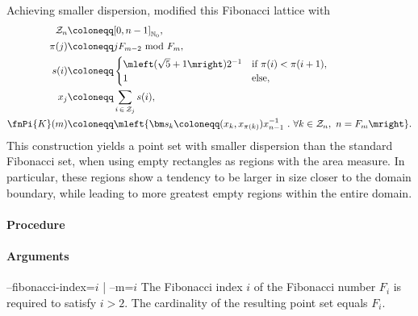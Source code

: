 
Achieving smaller dispersion,  modified this Fibonacci lattice with
\begin{align*}
  \mathcal Z_n &\coloneqq [0, n-1]_{\mathbb N_0}, \\
  \pi(j) &\coloneqq j F_{m-2}\ \text{mod}\ F_m, \\
  s(i) &\coloneqq \begin{cases}
    \mleft(\sqrt{5}+1\mright)2^{-1} & \text{if}\ \pi(i) < \pi(i+1), \\
    1 & \text{else},
  \end{cases} \\
  x_j &\coloneqq \sum_{i\,\in\,\mathcal Z_j} s(i), \\
  \fnPi{K}(m) &\coloneqq \mleft\{ \bm s_k \coloneqq (x_k, x_{\pi(k)}) x_{n-1}^{-1}\ .\ \forall k \in \mathcal Z_n,\ n = F_m \mright\}.
\end{align*}
This construction yields a point set with smaller dispersion than the standard Fibonacci set, when using empty rectangles as regions with the area measure. In particular, these regions show a tendency to be larger in size closer to the domain boundary, while leading to more greatest empty regions within the entire domain.


\paragraph{Procedure}

\begin{synopsis}
\end{synopsis}

\paragraph{Arguments}

\begin{procarg}{--fibonacci-index=$i$ | --m=$i$}
  The Fibonacci index $i$ of the Fibonacci number $F_i$ is required to satisfy $i > 2$. The cardinality of the resulting point set equals $F_i$.
\end{procarg}

